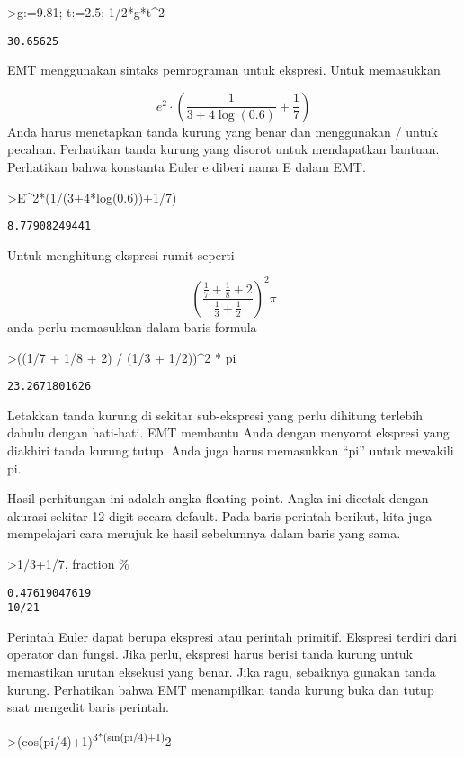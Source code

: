 \documentclass[
]{book}
\begin{document}
\textgreater g:=9.81; t:=2.5; 1/2*g*t\^{}2

\begin{verbatim}
30.65625
\end{verbatim}

EMT menggunakan sintaks pemrograman untuk ekspresi. Untuk memasukkan

\[e^2 \cdot \left( \frac{1}{3+4 \log(0.6)}+\frac{1}{7} \right)\]Anda harus menetapkan tanda kurung yang benar dan menggunakan / untuk pecahan. Perhatikan tanda kurung yang disorot untuk mendapatkan bantuan. Perhatikan bahwa konstanta Euler e diberi nama E dalam EMT.

\textgreater E\^{}2*(1/(3+4*log(0.6))+1/7)

\begin{verbatim}
8.77908249441
\end{verbatim}

Untuk menghitung ekspresi rumit seperti

\[\left(\frac{\frac17 + \frac18 + 2}{\frac13 + \frac12}\right)^2\pi\]anda perlu memasukkan dalam baris formula

\textgreater((1/7 + 1/8 + 2) / (1/3 + 1/2))\^{}2 * pi

\begin{verbatim}
23.2671801626
\end{verbatim}

Letakkan tanda kurung di sekitar sub-ekspresi yang perlu dihitung terlebih dahulu dengan hati-hati. EMT membantu Anda dengan menyorot ekspresi yang diakhiri tanda kurung tutup. Anda juga harus memasukkan ``pi'' untuk mewakili pi.

Hasil perhitungan ini adalah angka floating point. Angka ini dicetak dengan akurasi sekitar 12 digit secara default. Pada baris perintah berikut, kita juga mempelajari cara merujuk ke hasil sebelumnya dalam baris yang sama.

\textgreater1/3+1/7, fraction \%

\begin{verbatim}
0.47619047619
10/21
\end{verbatim}

Perintah Euler dapat berupa ekspresi atau perintah primitif. Ekspresi terdiri dari operator dan fungsi. Jika perlu, ekspresi harus berisi tanda kurung untuk memastikan urutan eksekusi yang benar. Jika ragu, sebaiknya gunakan tanda kurung. Perhatikan bahwa EMT menampilkan tanda kurung buka dan tutup saat mengedit baris perintah.

\textgreater(cos(pi/4)+1)\textsuperscript{3*(sin(pi/4)+1)}2
\end{document}
